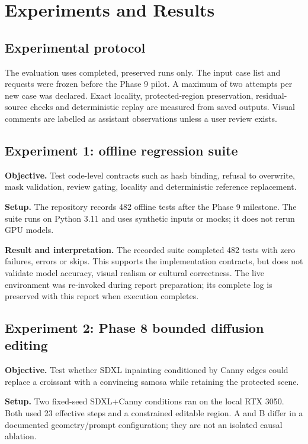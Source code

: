 \chapter{Experiments and Results}
\label{ch:results}
\section{Experimental protocol}
The evaluation uses completed, preserved runs only. The input case list and requests were frozen before the Phase 9 pilot. A maximum of two attempts per new case was declared. Exact locality, protected-region preservation, residual-source checks and deterministic replay are measured from saved outputs. Visual comments are labelled as assistant observations unless a user review exists.

\section{Experiment 1: offline regression suite}
\textbf{Objective.} Test code-level contracts such as hash binding, refusal to overwrite, mask validation, review gating, locality and deterministic reference replacement.

\textbf{Setup.} The repository records 482 offline tests after the Phase 9 milestone. The suite runs on Python 3.11 and uses synthetic inputs or mocks; it does not rerun GPU models.

\textbf{Result and interpretation.} The recorded suite completed 482 tests with zero failures, errors or skips. This supports the implementation contracts, but does not validate model accuracy, visual realism or cultural correctness. The live environment was re-invoked during report preparation; its complete log is preserved with this report when execution completes.

\section{Experiment 2: Phase 8 bounded diffusion editing}
\textbf{Objective.} Test whether SDXL inpainting conditioned by Canny edges could replace a croissant with a convincing samosa while retaining the protected scene.

\textbf{Setup.} Two fixed-seed SDXL+Canny conditions ran on the local RTX 3050. Both used 23 effective steps and a constrained editable region. A and B differ in a documented geometry/prompt configuration; they are not an isolated causal ablation.

